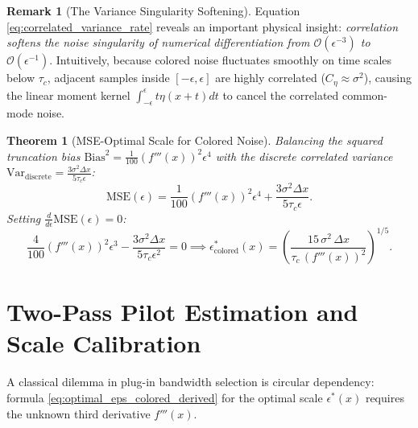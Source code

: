 \documentclass[11pt,a4paper]{article}
\newtheorem{theorem}{Theorem}
\theoremstyle{definition}
\newtheorem{remark}{Remark}
\begin{document}
\begin{remark}[The Variance Singularity Softening]
Equation \eqref{eq:correlated_variance_rate} reveals an important physical insight: \emph{correlation softens the noise singularity of numerical differentiation from $\mathcal{O}(\epsilon^{-3})$ to $\mathcal{O}(\epsilon^{-1})$}. Intuitively, because colored noise fluctuates smoothly on time scales below $\tau_c$, adjacent samples inside $[-\epsilon, \epsilon]$ are highly correlated ($C_\eta \approx \sigma^2$), causing the linear moment kernel $\int_{-\epsilon}^\epsilon t \eta(x+t) dt$ to cancel the correlated common-mode noise.
\end{remark}

\begin{theorem}[MSE-Optimal Scale for Colored Noise]
Balancing the squared truncation bias $\text{Bias}^2 = \frac{1}{100}(f'''(x))^2 \epsilon^4$ with the discrete correlated variance $\text{Var}_{\text{discrete}} = \frac{3\sigma^2 \Delta x}{5 \tau_c \epsilon}$:
\begin{equation}
\text{MSE}(\epsilon) = \frac{1}{100}(f'''(x))^2 \epsilon^4 + \frac{3\sigma^2 \Delta x}{5 \tau_c \epsilon}.
\end{equation}
Setting $\frac{d}{d\epsilon}\text{MSE}(\epsilon) = 0$:
\begin{equation}
\frac{4}{100}(f'''(x))^2 \epsilon^3 - \frac{3\sigma^2 \Delta x}{5 \tau_c \epsilon^2} = 0 \implies \epsilon_{\text{colored}}^*(x) = \left( \frac{15 \, \sigma^2 \, \Delta x}{\tau_c \, (f'''(x))^2} \right)^{1/5}.
\label{eq:optimal_eps_colored_derived}
\end{equation}
\end{theorem}


\section{Two-Pass Pilot Estimation and Scale Calibration}
\label{sec:pilot}

A classical dilemma in plug-in bandwidth selection is circular dependency: formula \eqref{eq:optimal_eps_colored_derived} for the optimal scale $\epsilon^*(x)$ requires the unknown third derivative $f'''(x)$.
\end{document}
